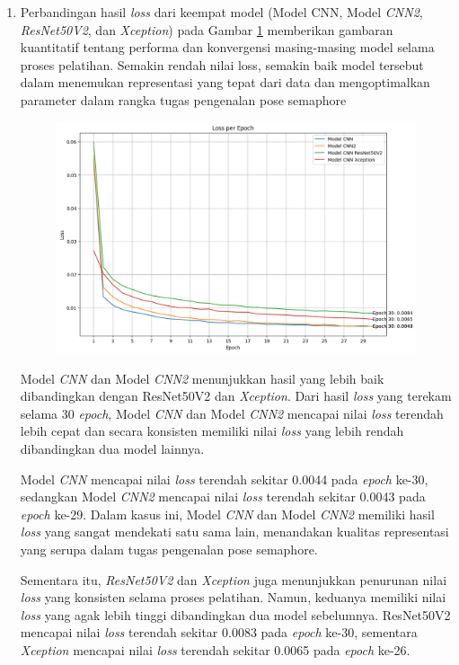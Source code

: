 \begin{enumerate}[nolistsep]

\item Perbandingan hasil \textit{loss} dari keempat model (Model CNN, Model \textit{CNN2}, \textit{ResNet50V2}, dan \textit{Xception}) pada Gambar \ref{fig:GrafikPerbandinganLoss} memberikan gambaran kuantitatif tentang performa dan konvergensi masing-masing model selama proses pelatihan. Semakin rendah nilai loss, semakin baik model tersebut dalam menemukan representasi yang tepat dari data dan mengoptimalkan parameter dalam rangka tugas pengenalan pose semaphore 
\begin{figure}[!hbt]
	\centering
	\includegraphics[width=0.7\linewidth]{gambar/bener/Perbandingan_LossCNN.png}
	\label{fig:GrafikPerbandinganLoss}
\end{figure}
Model \textit{CNN} dan Model \textit{CNN2} menunjukkan hasil yang lebih baik dibandingkan dengan ResNet50V2 dan \textit{Xception}. Dari hasil \textit{loss} yang terekam selama 30 \textit{epoch}, Model \textit{CNN} dan Model \textit{CNN2} mencapai nilai \textit{loss} terendah lebih cepat dan secara konsisten memiliki nilai \textit{loss} yang lebih rendah dibandingkan dua model lainnya.

Model \textit{CNN} mencapai nilai \textit{loss} terendah sekitar 0.0044 pada \textit{epoch} ke-30, sedangkan Model \textit{CNN2} mencapai nilai \textit{loss} terendah sekitar 0.0043 pada \textit{epoch} ke-29. Dalam kasus ini, Model \textit{CNN} dan Model \textit{CNN2} memiliki hasil \textit{loss} yang sangat mendekati satu sama lain, menandakan kualitas representasi yang serupa dalam tugas pengenalan pose semaphore.

Sementara itu, \textit{ResNet50V2} dan \textit{Xception} juga menunjukkan penurunan nilai \textit{loss} yang konsisten selama proses pelatihan. Namun, keduanya memiliki nilai \textit{loss} yang agak lebih tinggi dibandingkan dua model sebelumnya. ResNet50V2 mencapai nilai \textit{loss} terendah sekitar 0.0083 pada \textit{epoch} ke-30, sementara \textit{Xception} mencapai nilai \textit{loss} terendah sekitar 0.0065 pada \textit{epoch} ke-26.


\end{enumerate}
